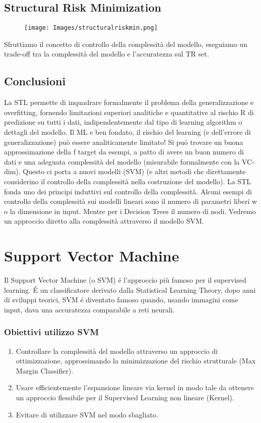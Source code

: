 \documentclass{article}
\begin{document}
\subsection{Structural Risk Minimization}
\begin{figure}[H]
\centering
\texttt{[image: Images/structuralriskmin.png]}
\end{figure}
Sfruttiamo il concetto di controllo della complessità del modello, eseguiamo un trade-off tra la complessità del modello e l'accuratezza sul TR set.

\subsection{Conclusioni}
La STL permette di inquadrare formalmente il problema della generalizzazione e overfitting, fornendo limitazioni superiori analitiche e quantitative al rischio R di predizione su tutti i dati, indipendentemente dal tipo di learning algorithm o dettagli del modello. Il ML e ben fondato, il rischio del learning (e dell'errore di generalizzazione) può essere analiticamente limitato! Si puó trovare un buona approssimazione della f target da esempi, a patto di avere un buon numero di dati e una adeguata complessità del modello (misurabile formalmente con la VC-dim). Questo ci porta a nuovi modelli (SVM) (e altri metodi che direttamente considerino il controllo della complessità nella costruzione del modello). La STL fonda uno dei principi induttivi sul controllo della complessità. \newline
Alcuni esempi di controllo della complessità sui modelli lineari sono il numero di parametri liberi w o la dimensione in input. Mentre per i Decision Trees il numero di nodi. Vedremo un approccio diretto alla complessità attraverso il modello SVM.

\section{Support Vector Machine}
Il Support Vector Machine (o SVM) é l'approccio più famoso per il supervised learning. É un classificatore derivato dalla Statistical Learning Theory, dopo anni di sviluppi teorici, SVM é diventato famoso quando, usando immagini come input, dava una accuratezza comparabile a reti neurali.

\subsubsection{Obiettivi utilizzo SVM}
\begin{enumerate}
    \item Controllare la complessità del modello attraverso un approccio di ottimizzazione, approssimando la minimizzazione del rischio strutturale (Max Margin Classifier).
    \item Usare efficientemente l'espansione lineare via kernel in modo tale da ottenere un approccio flessibile per il Supervised Learning non lineare (Kernel).
    \item Evitare di utilizzare SVM nel modo sbagliato.
\end{enumerate}
\clearpage
\end{document}
